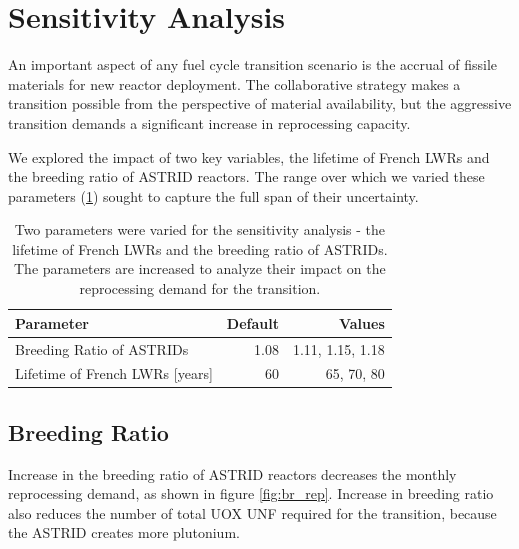 \section{Sensitivity Analysis}

An important aspect of any fuel cycle transition scenario
is the accrual of fissile materials for new reactor deployment.
The collaborative strategy makes a transition possible 
from the perspective of material availability,
but the aggressive transition demands a significant increase in reprocessing capacity.

We explored the impact of two key variables, the lifetime of French \glspl{LWR} and the
breeding ratio of \gls{ASTRID} reactors. The range over which we varied these parameters (\cref{tab:sen_par})
sought to capture the full span of their uncertainty.

\begin{table}[h]
    \centering
    \caption {Two parameters were varied for the sensitivity analysis - the 
              lifetime of French \glspl{LWR} and the breeding ratio of \glspl{ASTRID}.
              The parameters are increased to analyze their impact on the reprocessing
              demand for the transition.}
    \begin{tabularx}{\textwidth}{lrr}
        \hline
        \textbf{Parameter} & \textbf{Default} & \textbf{Values} \\
        \hline
        Breeding Ratio of \glspl{ASTRID} & 1.08 & 1.11, 1.15, 1.18 \\ 
        Lifetime of French \glspl{LWR} [years] & 60  & 65, 70, 80 \\
        \hline
    \end{tabularx}
    
    \label{tab:sen_par}
\end{table}

\subsection{Breeding Ratio}

Increase in the breeding ratio of \gls{ASTRID} reactors
decreases the monthly reprocessing demand, as shown in figure \ref{fig:br_rep}.
Increase in breeding ratio also reduces the number of total \gls{UOX} \gls{UNF}
required for the transition, because the \gls{ASTRID} creates more plutonium.


